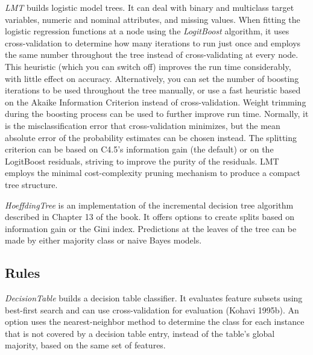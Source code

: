 \textit{LMT} builds logistic model trees. It can deal with binary and
multiclass target variables, numeric and nominal attributes, and
missing values. When fitting the logistic regression functions at a
node using the \textit{LogitBoost} algorithm, it uses cross-validation
to determine how many iterations to run just once and employs the same
number throughout the tree instead of cross-validating at every
node. This heuristic (which you can switch off) improves the run time
considerably, with little effect on accuracy. Alternatively, you can
set the number of boosting iterations to be used throughout the tree
manually, or use a fast heuristic based on the Akaike Information
Criterion instead of cross-validation. Weight trimming during the
boosting process can be used to further improve run time. Normally, it
is the misclassification error that cross-validation minimizes, but
the mean absolute error of the probability estimates can be chosen
instead. The splitting criterion can be based on C4.5's information
gain (the default) or on the LogitBoost residuals, striving to improve
the purity of the residuals. LMT employs the minimal cost-complexity
pruning mechanism to produce a compact tree structure.

\textit{HoeffdingTree} is an implementation of the incremental decision tree
algorithm described in Chapter 13 of the book. It offers options to
create splits based on information gain or the Gini index. Predictions
at the leaves of the tree can be made by either majority class or
naive Bayes models.

\subsection{Rules}

\textit{DecisionTable} builds a decision table classifier. It
evaluates feature subsets using best-first search and can use
cross-validation for evaluation (Kohavi 1995b). An option uses the
nearest-neighbor method to determine the class for each instance that
is not covered by a decision table entry, instead of the table's
global majority, based on the same set of features.

